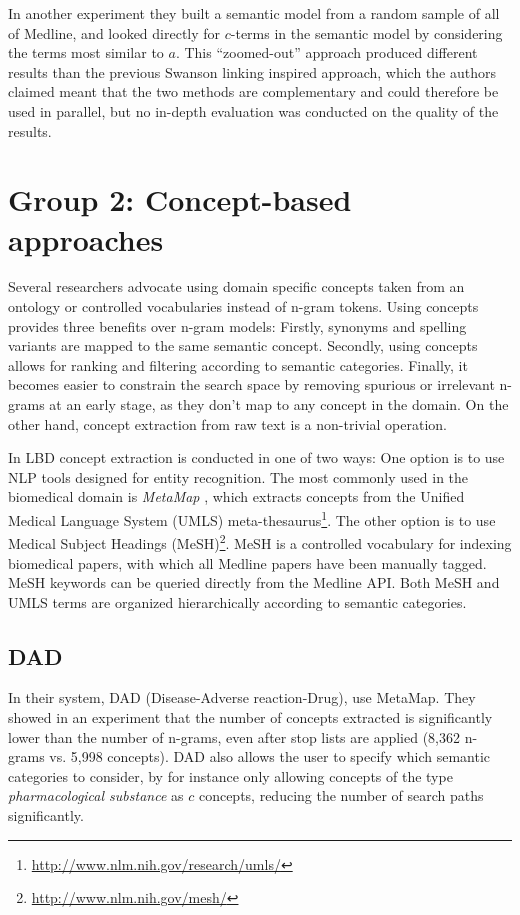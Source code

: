 In another experiment they built a semantic model from a random sample of all of Medline, and looked directly for $c$-terms in the semantic model by considering the terms most similar to $a$. This ``zoomed-out'' approach produced different results than the previous Swanson linking inspired approach, which the authors claimed meant that the two methods are complementary and could therefore be used in parallel, but no in-depth evaluation was conducted on the quality of the results. 

\section{Group 2: Concept-based approaches}

Several researchers advocate using domain specific concepts taken from an ontology or controlled vocabularies instead of n-gram tokens. Using concepts provides three benefits over n-gram models: Firstly, synonyms and spelling variants are mapped to the same semantic concept.  Secondly, using concepts allows for ranking and filtering according to semantic categories. Finally, it becomes easier to constrain the search space by removing spurious or irrelevant n-grams at an early stage, as they don't map to any concept in the domain. On the other hand, concept extraction from raw text is a non-trivial operation.

In LBD concept extraction is conducted in one of two ways: One option is to use NLP tools designed for entity recognition. The most commonly used in the biomedical domain is \emph{MetaMap} \cite{aro10}, which extracts concepts from the Unified Medical Language System (UMLS) meta-thesaurus\footnote{\url{http://www.nlm.nih.gov/research/umls/}}. The other option is to use Medical Subject Headings (MeSH)\footnote{\url{http://www.nlm.nih.gov/mesh/}}. MeSH is a controlled vocabulary for indexing biomedical papers, with which all Medline papers have been manually tagged. MeSH keywords can be queried directly from the Medline API. Both MeSH and UMLS terms are organized hierarchically according to semantic categories.

\subsection{DAD}

In their system, DAD (Disease-Adverse reaction-Drug), \citet{wee01} use MetaMap. They showed in an experiment that the number of concepts extracted is significantly lower than the number of n-grams, even after stop lists are applied (8,362 n-grams vs. 5,998 concepts). DAD also allows the user to specify which semantic categories to consider, by for instance only allowing concepts of the type \emph{pharmacological substance} as $c$ concepts, reducing the number of search paths significantly.

